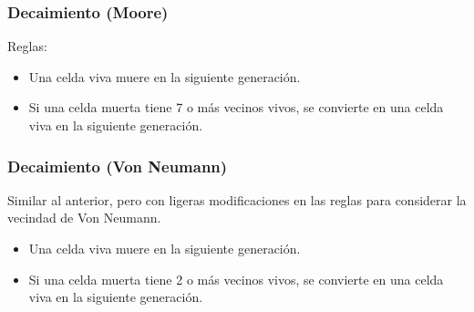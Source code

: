 \subsubsection{Decaimiento (Moore)}
Reglas:
\begin{itemize}
    \item Una celda viva muere en la siguiente generación.
    \item Si una celda muerta tiene 7 o más vecinos vivos, se convierte en una celda viva en la siguiente generación.
\end{itemize}

\subsubsection{Decaimiento (Von Neumann)}
Similar al anterior, pero con ligeras modificaciones en las reglas para considerar la vecindad de Von Neumann.
\begin{itemize}
    \item Una celda viva muere en la siguiente generación.
    \item Si una celda muerta tiene 2 o más vecinos vivos, se convierte en una celda viva en la siguiente generación.
\end{itemize}


